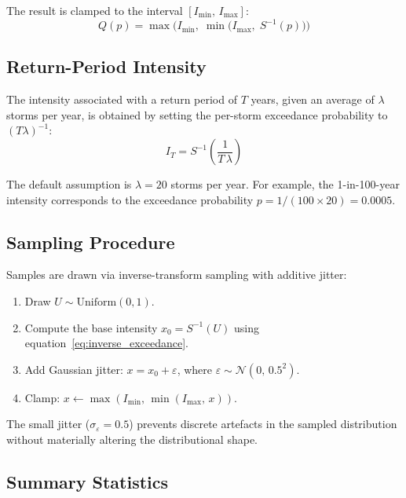\documentclass[11pt,a4paper]{article}
\begin{document}
The result is clamped to the interval $[I_{\min},\, I_{\max}]$:
\begin{equation}
    Q(p) = \max\!\Big(I_{\min},\;\min\!\big(I_{\max},\; S^{-1}(p)\big)\Big)
    \label{eq:clamped_quantile}
\end{equation}

\subsection{Return-Period Intensity}

The intensity associated with a return period of $T$ years, given an average of
$\lambda$ storms per year, is obtained by setting the per-storm exceedance
probability to $(T\lambda)^{-1}$:
\begin{equation}
    I_T = S^{-1}\!\left(\frac{1}{T\,\lambda}\right)
    \label{eq:return_period}
\end{equation}

\noindent The default assumption is $\lambda = 20$ storms per year. For example,
the 1-in-100-year intensity corresponds to the exceedance probability
$p = 1/(100 \times 20) = 0.0005$.

\subsection{Sampling Procedure}

Samples are drawn via inverse-transform sampling with additive jitter:
\begin{enumerate}[nosep]
    \item Draw $U \sim \text{Uniform}(0,1)$.
    \item Compute the base intensity $x_0 = S^{-1}(U)$ using equation~\eqref{eq:inverse_exceedance}.
    \item Add Gaussian jitter: $x = x_0 + \varepsilon$, where $\varepsilon \sim \mathcal{N}(0,\, 0.5^2)$.
    \item Clamp: $x \leftarrow \max(I_{\min},\, \min(I_{\max},\, x))$.
\end{enumerate}

\noindent The small jitter ($\sigma_\varepsilon = 0.5$) prevents discrete artefacts
in the sampled distribution without materially altering the distributional shape.

\subsection{Summary Statistics}
\end{document}
